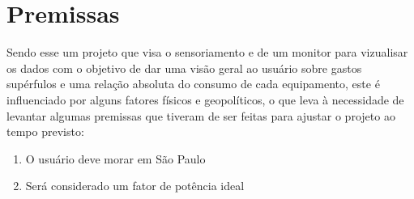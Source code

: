 \section{Premissas}

Sendo esse um projeto que visa o sensoriamento e de um monitor para vizualisar os dados com o objetivo de dar uma visão geral ao usuário sobre gastos supérfulos e uma relação absoluta do consumo de cada equipamento, este é influenciado por alguns fatores físicos e geopolíticos, o que leva à necessidade de levantar algumas premissas que tiveram de ser feitas para ajustar o projeto ao tempo previsto:

\begin{enumerate}
\item{O usuário deve morar em São Paulo}
\item{Será considerado um fator de potência ideal}
\end{enumerate}